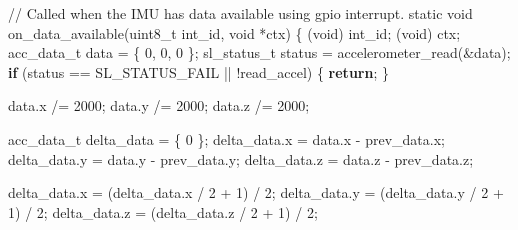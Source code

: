 \documentclass[
  9pt,
  letterpaper,
  abstract,
  titlepage]{scrbook}
\newenvironment{Shaded}{\begin{snugshade}}{\end{snugshade}}
\newcommand{\CommentTok}[1]{\textcolor[rgb]{0.37,0.37,0.37}{#1}}
\newcommand{\ControlFlowTok}[1]{\textcolor[rgb]{0.00,0.23,0.31}{\textbf{#1}}}
\newcommand{\DataTypeTok}[1]{\textcolor[rgb]{0.68,0.00,0.00}{#1}}
\newcommand{\DecValTok}[1]{\textcolor[rgb]{0.68,0.00,0.00}{#1}}
\newcommand{\NormalTok}[1]{\textcolor[rgb]{0.00,0.23,0.31}{#1}}
\newcommand{\OperatorTok}[1]{\textcolor[rgb]{0.37,0.37,0.37}{#1}}
\begin{document}
\begin{Shaded}
\begin{Highlighting}[]
\CommentTok{// Called when the IMU has data available using gpio interrupt.}
\DataTypeTok{static} \DataTypeTok{void}\NormalTok{ on\_data\_available}\OperatorTok{(}\DataTypeTok{uint8\_t}\NormalTok{ int\_id}\OperatorTok{,} \DataTypeTok{void} \OperatorTok{*}\NormalTok{ctx}\OperatorTok{)}
\OperatorTok{\{}
  \OperatorTok{(}\DataTypeTok{void}\OperatorTok{)}\NormalTok{ int\_id}\OperatorTok{;}
  \OperatorTok{(}\DataTypeTok{void}\OperatorTok{)}\NormalTok{ ctx}\OperatorTok{;}
\NormalTok{  acc\_data\_t data }\OperatorTok{=} \OperatorTok{\{} \DecValTok{0}\OperatorTok{,} \DecValTok{0}\OperatorTok{,} \DecValTok{0} \OperatorTok{\};}
\NormalTok{  sl\_status\_t status }\OperatorTok{=}\NormalTok{ accelerometer\_read}\OperatorTok{(\&}\NormalTok{data}\OperatorTok{);}
  \ControlFlowTok{if} \OperatorTok{(}\NormalTok{status }\OperatorTok{==}\NormalTok{ SL\_STATUS\_FAIL }\OperatorTok{||} \OperatorTok{!}\NormalTok{read\_accel}\OperatorTok{)} \OperatorTok{\{}
    \ControlFlowTok{return}\OperatorTok{;}
  \OperatorTok{\}}

\NormalTok{  data}\OperatorTok{.}\NormalTok{x }\OperatorTok{/=} \DecValTok{2000}\OperatorTok{;}
\NormalTok{  data}\OperatorTok{.}\NormalTok{y }\OperatorTok{/=} \DecValTok{2000}\OperatorTok{;}
\NormalTok{  data}\OperatorTok{.}\NormalTok{z }\OperatorTok{/=} \DecValTok{2000}\OperatorTok{;}

\NormalTok{  acc\_data\_t delta\_data }\OperatorTok{=} \OperatorTok{\{} \DecValTok{0} \OperatorTok{\};}
\NormalTok{  delta\_data}\OperatorTok{.}\NormalTok{x }\OperatorTok{=}\NormalTok{ data}\OperatorTok{.}\NormalTok{x }\OperatorTok{{-}}\NormalTok{ prev\_data}\OperatorTok{.}\NormalTok{x}\OperatorTok{;}
\NormalTok{  delta\_data}\OperatorTok{.}\NormalTok{y }\OperatorTok{=}\NormalTok{ data}\OperatorTok{.}\NormalTok{y }\OperatorTok{{-}}\NormalTok{ prev\_data}\OperatorTok{.}\NormalTok{y}\OperatorTok{;}
\NormalTok{  delta\_data}\OperatorTok{.}\NormalTok{z }\OperatorTok{=}\NormalTok{ data}\OperatorTok{.}\NormalTok{z }\OperatorTok{{-}}\NormalTok{ prev\_data}\OperatorTok{.}\NormalTok{z}\OperatorTok{;}

\NormalTok{  delta\_data}\OperatorTok{.}\NormalTok{x }\OperatorTok{=} \OperatorTok{(}\NormalTok{delta\_data}\OperatorTok{.}\NormalTok{x }\OperatorTok{/} \DecValTok{2} \OperatorTok{+} \DecValTok{1}\OperatorTok{)} \OperatorTok{/} \DecValTok{2}\OperatorTok{;}
\NormalTok{  delta\_data}\OperatorTok{.}\NormalTok{y }\OperatorTok{=} \OperatorTok{(}\NormalTok{delta\_data}\OperatorTok{.}\NormalTok{y }\OperatorTok{/} \DecValTok{2} \OperatorTok{+} \DecValTok{1}\OperatorTok{)} \OperatorTok{/} \DecValTok{2}\OperatorTok{;}
\NormalTok{  delta\_data}\OperatorTok{.}\NormalTok{z }\OperatorTok{=} \OperatorTok{(}\NormalTok{delta\_data}\OperatorTok{.}\NormalTok{z }\OperatorTok{/} \DecValTok{2} \OperatorTok{+} \DecValTok{1}\OperatorTok{)} \OperatorTok{/} \DecValTok{2}\OperatorTok{;}


\end{Highlighting}
\end{Shaded}
\end{document}
